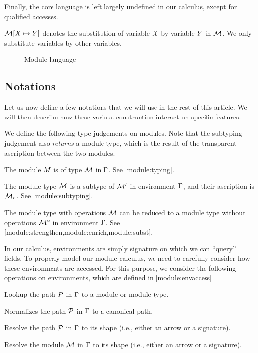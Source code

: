 Finally, the core language is left largely undefined in our calculus, except for qualified accesses.

$\mathcal M\!\left[X \mapsto Y\right]$ denotes the substitution of variable $X$ by variable $Y$ in $\mathcal M$. We only substitute variables by other variables.

\begin{figure}[!hb]
  
  \caption{Module language}
  \label{grammar}
\end{figure}


\subsection{Notations}

Let us now define a few notations that we will use in the rest of this
article. We will then describe how these various construction interact
on specific features.

We define the following type judgements on modules. Note that the subtyping
judgement also \emph{returns} a module type, which is the result
of the transparent ascription between the two modules.
\begin{description}[align=right, leftmargin=3.5cm]
\item[$\wtm{\E}{\im}{\iM}$ :]
  The module $M$ is of type $\mathcal M$ in $\Gamma$.
  See \cref{module:typing}.
\item[$\submod{\E}{\iM}{\iM'}{\iM_r}$ :]
  The module type $\mathcal M$ is a subtype of $\mathcal M'$ in environment $\Gamma$,
  and their ascription is $\mathcal M_r$.
  See \cref{module:subtyping}.
\item[$\Oreduce{\E}{\iM} = \iMO$ :]
  The module type with operations $\mathcal M$ can be reduced to a module
  type without operations ${\mathcal M^\circ}$ in environment $\Gamma$.
  See \cref{module:strengthen,module:enrich,module:subst}.
\end{description}

In our calculus, environments are simply signature on which we can
``query'' fields.
To properly model our module calculus, we need to carefully consider
how these environments are accessed. For this purpose, we consider the following
operations on environments, which are defined in \cref{module:envaccess}
\begin{description}[align=right, leftmargin=3.5cm]
\item[$\lookup{\E}{\ip}$ :]
  Lookup the path $P$ in $\Gamma$ to a module or module type.
\item[$\Onormalize{\E}{\iP}$ :]
  Normalizes the path $\mathcal P$ in $\Gamma$ to a canonical path.
\item[$\resolve{\E}{\iP}$ :]
  Resolve the path $\mathcal P$ in $\Gamma$ to its shape (i.e., either an arrow or a signature).
\item[$\Oshape{\E}{\iM}$ :]
  Resolve the module $\mathcal M$ in $\Gamma$ to its shape (i.e., either an arrow or a signature).
\end{description}


